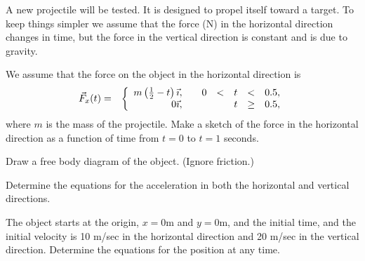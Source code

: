 \begin{problem}
\item A new projectile will be tested. It is designed to propel itself
  toward a target. To keep things simpler we assume that the force (N)
  in the horizontal direction changes in time, but the force in the
  vertical direction is constant and is due to gravity.
  \begin{subproblem}
    \item We assume that the force on the object in the horizontal
      direction is
      \begin{eqnarray*}
        \vec{F}_x(t) & = & \left\{
                     \begin{array}{r@{\hspace{2em}}rcccl}
                       m\left(\frac{1}{2}-t\right) \vec{\imath}, & 0 & < & t & < & 0.5, \\
                       0 \vec{\imath},        &   &   & t & \geq & 0.5,
                     \end{array}
                     \right.
      \end{eqnarray*}
      where $m$ is the mass of the projectile.  Make a sketch of the
      force in the horizontal direction as a function of time from
      $t=0$ to $t=1$ seconds.

      \vfill

    \item Draw a free body diagram of the object. (Ignore friction.)
      \vfill

    \item Determine the equations for the acceleration in both the
      horizontal and vertical directions.

      \vfill

      \clearpage

    \item The object starts at the origin, $x=0$m and $y=0$m, and the
      initial time, and the initial velocity is 10 m/sec in the
      horizontal direction and 20 m/sec in the vertical
      direction. Determine the equations for the position at any time.

      \vfill

  \end{subproblem}

  \clearpage


\end{problem}
